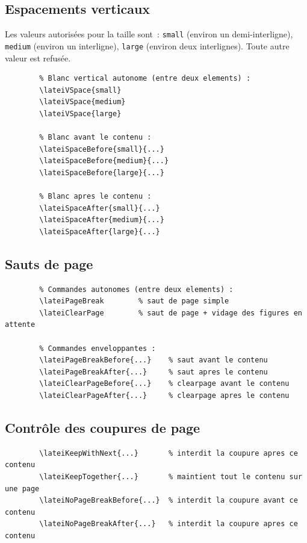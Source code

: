 \documentclass[11pt,a4paper]{article}
\begin{document}
	\subsection{Espacements verticaux}
	
	Les valeurs autorisées pour la taille sont~: \texttt{small} (environ un
	demi-interligne), \texttt{medium} (environ un interligne), \texttt{large}
	(environ deux interlignes). Toute autre valeur est refusée.
	
	\begin{lstlisting}
		% Blanc vertical autonome (entre deux elements) :
		\lateiVSpace{small}
		\lateiVSpace{medium}
		\lateiVSpace{large}
		
		% Blanc avant le contenu :
		\lateiSpaceBefore{small}{...}
		\lateiSpaceBefore{medium}{...}
		\lateiSpaceBefore{large}{...}
		
		% Blanc apres le contenu :
		\lateiSpaceAfter{small}{...}
		\lateiSpaceAfter{medium}{...}
		\lateiSpaceAfter{large}{...}
	\end{lstlisting}
	
	\subsection{Sauts de page}
	
	\begin{lstlisting}
		% Commandes autonomes (entre deux elements) :
		\lateiPageBreak        % saut de page simple
		\lateiClearPage        % saut de page + vidage des figures en attente
		
		% Commandes enveloppantes :
		\lateiPageBreakBefore{...}    % saut avant le contenu
		\lateiPageBreakAfter{...}     % saut apres le contenu
		\lateiClearPageBefore{...}    % clearpage avant le contenu
		\lateiClearPageAfter{...}     % clearpage apres le contenu
	\end{lstlisting}
	
	\subsection{Contrôle des coupures de page}
	
	\begin{lstlisting}
		\lateiKeepWithNext{...}       % interdit la coupure apres ce contenu
		\lateiKeepTogether{...}       % maintient tout le contenu sur une page
		\lateiNoPageBreakBefore{...}  % interdit la coupure avant ce contenu
		\lateiNoPageBreakAfter{...}   % interdit la coupure apres ce contenu
	\end{lstlisting}
	
\end{document}
